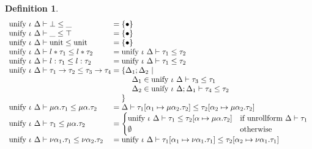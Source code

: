 \documentclass[manuscript]{acmart}
\theoremstyle{definition}
\newtheorem{definition}{Definition}[section]
\begin{document}
\begin{definition}
\[
  \begin{array}{l @{} l}
    \text{unify } \iota\ \Delta \vdash \bot \leq \_	
    &{} = 
    \{\bullet\}
    \\
    \text{unify } \iota\ \Delta \vdash \_ \leq \top	
    &{} = 
    \{\bullet\}
    \\
    \text{unify } \iota\ \Delta \vdash \text{unit}  \leq \text{unit}	
    &{} = 
    \{\bullet\}
    \\
    \text{unify } \iota\ \Delta \vdash l*\tau_1 \leq l*\tau_2	
    &{} = 
    \text{unify } \iota\ \Delta \vdash \tau_1 \leq \tau_2
    \\
    \text{unify } \iota\ \Delta \vdash l:\tau_1 \leq l:\tau_2	
    &{} = 
    \text{unify } \iota\ \Delta \vdash \tau_1 \leq \tau_2
    \\
    \text{unify } \iota\ \Delta \vdash \tau_1\rightarrow\tau_2 \leq \tau_3\rightarrow\tau_4	
    &{} = 
    \begin{array}[t]{@{} l}
      \{\Delta_1;\Delta_2\ |
      \\ 
      \ \ \ \ \Delta_1 \in \text{unify } \iota\ \Delta \vdash \tau_3 \leq \tau_1
      \\
      \ \ \ \ \Delta_2 \in \text{unify } \iota\ \Delta;\Delta_1 \vdash \tau_4 \leq \tau_2
      \\
      \}
    \end{array}
    \\
    \text{unify } \iota\ \Delta \vdash
    \mu \alpha . \tau_1 \leq \mu \alpha . \tau_2
    &{} = 
    \Delta \vdash 
    \tau_1[\alpha_1\mapsto\mu\alpha_2.\tau_2] \leq 
    \tau_2[\alpha_2\mapsto\mu\alpha_2.\tau_2]

    \\
    \text{unify } \iota\ \Delta \vdash
    \tau_1 \leq \mu \alpha . \tau_2
    &{} = 
    \begin{cases}  
      \text{unify } \iota\ \Delta \vdash 
      \tau_1 \leq \tau_2[\alpha\mapsto\mu\alpha.\tau_2]	
      &\text{if }
      \text{unrollform } \Delta \vdash \tau_1
      \\
      \emptyset
      &\text{otherwise}
    \end{cases}

    \\
    \text{unify } \iota\ \Delta \vdash
    \nu \alpha_1 . \tau_1 \leq 
    \nu \alpha_2 . \tau_2	
    &{} = 
    \text{unify } \iota\ \Delta \vdash 
    \tau_1[\alpha_1\mapsto\nu\alpha_1.\tau_1] \leq 
    \tau_2[\alpha_2\mapsto\nu\alpha_1.\tau_1]


\end{array}\]
\end{definition}
\end{document}
